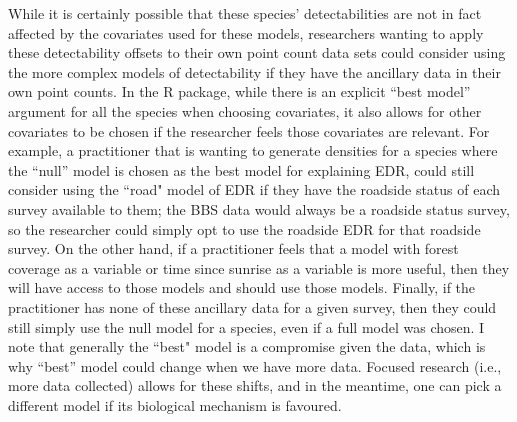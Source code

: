 \par While it is certainly possible that these species’ detectabilities are not in fact affected by the covariates used for these models, researchers wanting to apply these detectability offsets to their own point count data sets could consider using the more complex models of detectability if they have the ancillary data in their own point counts. In the  R package, while there is an explicit “best model” argument for all the species when choosing covariates, it also allows for other covariates to be chosen if the researcher feels those covariates are relevant. For example, a practitioner that is wanting to generate densities for a species where the “null” model is chosen as the best model for explaining EDR, could still consider using the ``road" model of EDR if they have the roadside status of each survey available to them; the BBS data would always be a roadside status survey, so the researcher could simply opt to use the roadside EDR for that roadside survey. On the other hand, if a practitioner feels that a model with forest coverage as a variable or time since sunrise as a variable is more useful, then they will have access to those models and should use those models. Finally, if the practitioner has none of these ancillary data for a given survey, then they could still simply use the null model for a species, even if a full model was chosen. I note that generally the ``best" model is a compromise given the data, which is why “best” model could change when we have more data. Focused research (i.e., more data collected) allows for these shifts, and in the meantime, one can pick a different model if its biological mechanism is favoured. 

